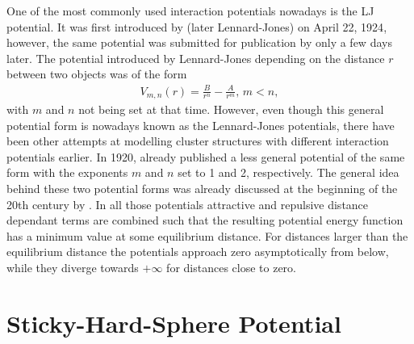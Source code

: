 One of the most commonly used interaction potentials nowadays is the \ac{LJ}
potential. It was first introduced by
\citeauthor{Jones_DeterminationMolecularFields_1924} (later Lennard-Jones) on
April 22, 1924\autocite{Jones_DeterminationMolecularFields_1924}, however, the
same potential was submitted for publication by
\citeauthor{Simon_KristallstrukturArgons_1924} only a few days
later.\autocite{Simon_KristallstrukturArgons_1924} The potential introduced by
Lennard-Jones depending on the distance $r$ between two objects was of the form
%
\begin{align}
    V_{m,n}(r)=\frac{B}{r^n}-\frac{A}{r^m},\, m<n,
\end{align}
%
with $m$ and $n$ not being set at that time. However, even though this general
potential form is nowadays known as the Lennard-Jones potentials, there have
been other attempts at modelling cluster structures with different interaction
potentials earlier. In 1920,
\citeauthor{Kratzer_ultrarotenRotationsspektrenHalogenwasserstoffe_1920}\autocite{Kratzer_ultrarotenRotationsspektrenHalogenwasserstoffe_1920}
already published a less general potential of the same form with the exponents
$m$ and $n$ set to 1 and 2, respectively. The general idea behind these two
potential forms was already discussed at the beginning of the 20th century by
\citeauthor{Mie_ZurkinetischenTheorie_1903}\autocite{Mie_ZurkinetischenTheorie_1903}.
In all those potentials attractive and repulsive distance dependant terms are
combined such that the resulting potential energy function has a minimum value
at some equilibrium distance. For distances larger than the equilibrium
distance the potentials approach zero asymptotically from below, while they
diverge towards $+\infty$ for distances close to zero.


\section{Sticky-Hard-Sphere Potential}
\label{sec:SHS}
